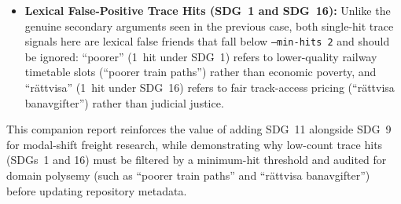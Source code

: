 \begin{casestudySection}
\begin{itemize}
    \item \textbf{Lexical False-Positive Trace Hits (\gls{SDG}~1 and \gls{SDG}~16):} Unlike the genuine secondary arguments seen in the previous case, both single-hit trace signals here are lexical false friends that fall below \texttt{--min-hits 2} and should be ignored: \enquote{poorer} (\num{1}~hit under \gls{SDG}~1) refers to lower-quality railway timetable slots (\enquote{poorer train paths}) rather than economic poverty, and \enquote{\foreignlanguage{swedish}{rättvisa}} (\num{1}~hit under \gls{SDG}~16) refers to fair track-access pricing (\enquote{\foreignlanguage{swedish}{rättvisa banavgifter}}) rather than judicial justice.
\end{itemize}
\end{casestudySection}

\begin{takeaway}
This companion report reinforces the value of adding \gls{SDG}~11 alongside \gls{SDG}~9 for modal-shift freight research, while demonstrating why low-count trace hits (\glspl{SDG}~1 and 16) must be filtered by a minimum-hit threshold and audited for domain polysemy (such as \enquote{poorer train paths} and \enquote{\foreignlanguage{swedish}{rättvisa banavgifter}}) before updating repository metadata.
\end{takeaway}

